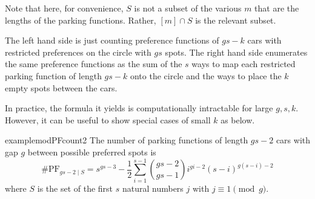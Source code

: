 \documentclass[12 pt]{amsart}
\theoremstyle{definition} %
\theoremstyle{remark} %
\begin{document}
Note that here, for convenience, $S$ is not a subset of the various $m$ that are the lengths of the parking functions. Rather, $[m] \cap S$ is the relevant subset. 

The left hand side is just counting preference functions of $gs - k$ cars with restricted preferences on the circle with $gs$ spots. The right hand side enumerates the same preference functions as the sum of the $s$ ways to map each restricted parking function of length $gs - k$ onto the circle and the ways to place the $k$ empty spots between the cars. 

In practice, the formula it yields is computationally intractable for large $g, s, k$. However, it can be useful to show special cases of small $k$ as below.

\begin{restatable}{example}{modPFcount2}
	The number of parking functions of length $gs - 2$ cars with gap $g$ between possible preferred spots is
	\[
		\#\mathrm{PF}_{gs - 2 \mid S} = s^{gs - 3} - \frac{1}{2} \sum_{i = 1}^{s - 1} \binom{gs - 2}{gs - 1} i^{gi - 2} (s - i)^{g(s - i) - 2}
	\]
	where $S$ is the set of the first $s$ natural numbers $j$ with $j \equiv 1 \pmod g$.
\end{restatable}



\end{document}

